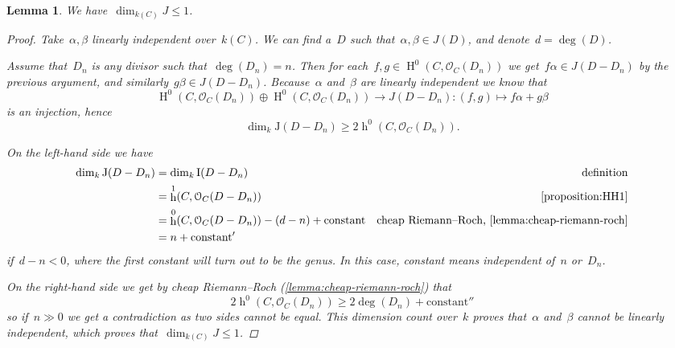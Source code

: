 \documentclass[10pt,a4paper]{article}
\theoremstyle{lecture}
\newtheorem{lemma}[theorem]{Lemma}
\DeclareMathOperator\hh{h}
\DeclareMathOperator\HH{H}
\begin{document}
\begin{lemma}
  \label{lemma:dim-J-1}
  We have~$\dim_{k(C)}J\leq 1$.
  \begin{proof}
    Take~$\alpha,\beta$ linearly independent over~$k(C)$. We can find a~$D$ such that~$\alpha,\beta\in J(D)$, and denote~$d=\deg(D)$.

    Assume that~$D_n$ is any divisor such that~$\deg(D_n)=n$. Then for each~$f,g\in\HH^0(C,\mathcal{O}_C(D_n))$ we get~$f\alpha\in J(D-D_n)$ by the previous argument, and similarly~$g\beta\in J(D-D_n)$. Because~$\alpha$ and~$\beta$ are linearly independent we know that
    \begin{equation}
      \HH^0(C,\mathcal{O}_C(D_n))\oplus\HH^0(C,\mathcal{O}_C(D_n))\to J(D-D_n)\colon(f,g)\mapsto f\alpha+g\beta
    \end{equation}
    is an injection, hence
    \begin{equation}
      \dim_k\mathrm{J}(D-D_n)\geq 2\hh^0(C,\mathcal{O}_C(D_n)).
    \end{equation}

    On the left-hand side we have
    \begin{equation}
      \begin{aligned}
        \dim_k\mathrm{J}(D-D_n)&=\dim_k\mathrm{I}(D-D_n) & \text{definition} \\
        &=\hh^1(C,\mathcal{O}_C(D-D_n)) & \text{\cref{proposition:HH1}} \\
        &=\hh^0(C,\mathcal{O}_C(D-D_n))-(d-n)+\text{constant} & \text{cheap Riemann--Roch, \cref{lemma:cheap-riemann-roch}} \\
        &=n+\text{constant}'
      \end{aligned}
    \end{equation}
    if~$d-n<0$, where the first constant will turn out to be the genus\checkthis. In this case, constant means independent of~$n$ or~$D_n$.

    On the right-hand side we get by cheap Riemann--Roch (\cref{lemma:cheap-riemann-roch}) that
    \begin{equation}
      2\hh^0(C,\mathcal{O}_C(D_n))\geq 2\deg(D_n)+\text{constant}''
    \end{equation}
    so if~$n\gg 0$ we get a contradiction as two sides cannot be equal. This dimension count over~$k$ proves that~$\alpha$ and~$\beta$ cannot be linearly independent, which proves that~$\dim_{k(C)}J\leq 1$.
  \end{proof}
\end{lemma}
\end{document}
